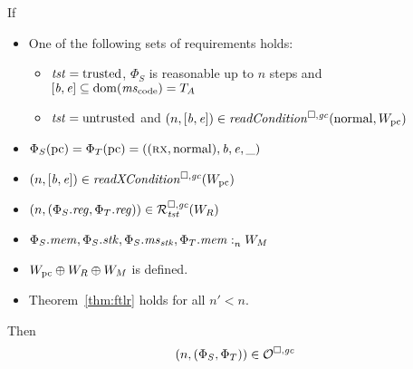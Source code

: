 \begin{lemma}
  \label{lem:ftlr-internal-lemma}
  If
  \begin{itemize}
  \item One of the following sets of requirements holds:
    \begin{itemize}
    \item $\mathit{tst} = \mathrm{trusted}$, $\Phi_S$ is reasonable up to $n$ steps and $[\baddr,\eaddr] \subseteq \dom(\mscode) = \ta$
    \item $\mathit{tst} = \mathrm{untrusted}$ and $\npair{[\baddr,\eaddr]} \in \readCond{\normal,W_\pcreg}$
    \end{itemize}
  \item $\Phi_S(\mathrm{pc}) = \Phi_T(\mathrm{pc}) = ((\textsc{rx},\mathrm{normal}),\mathit{b},\mathit{e},\_)$
  \item $\npair{[\baddr,\eaddr]} \in \xReadCond{W_\pcreg}$
  \item $\npair{(\Phi_S.\reg,\Phi_T.\reg)} \in \lrrg{\trust}(W_R)$
  \item $\Phi_S.\mathit{mem},\Phi_S.\mathit{stk},\Phi_S.\mathit{ms}_{\mathit{stk}},\Phi_T.\mathit{mem} :_{n}^{}W_M$
  \item $W_{\mathrm{pc}} \oplus W_R \oplus W_M$ is defined.
  \item Theorem~\ref{thm:ftlr} holds for all $n' < n$.
  \end{itemize}
  Then
  \[
    \left(n,(\Phi_S,\Phi_T)\right) \in \mathcal{O}^{\square,\mathit{gc}}
  \]
\end{lemma}
